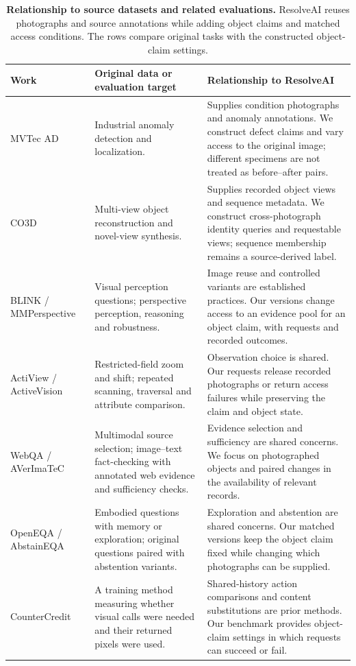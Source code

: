 \begin{table}[t]
\centering\small
\caption{\textbf{Relationship to source datasets and related evaluations.}
ResolveAI reuses photographs and source annotations while adding object claims and matched access conditions.
The rows compare original tasks with the constructed object-claim settings.}
\label{tab:related-comparison}
\renewcommand{\arraystretch}{1.15}
\begin{tabularx}{\textwidth}{@{}>{\raggedright\arraybackslash}p{}>{\raggedright\arraybackslash}p{}Y@{}}
\toprule
Work & Original data or evaluation target & Relationship to ResolveAI\\
\midrule
MVTec AD~\cite{mvtec} &
Industrial anomaly detection and localization. &
Supplies condition photographs and anomaly annotations. We construct defect claims and vary access to the original image; different specimens are not treated as before--after pairs.\\
CO3D~\cite{co3d} &
Multi-view object reconstruction and novel-view synthesis. &
Supplies recorded object views and sequence metadata. We construct cross-photograph identity queries and requestable views; sequence membership remains a source-derived label.\\
BLINK / \mbox{MMPerspective}~\cite{blink,mmperspective} &
Visual perception questions; perspective perception, reasoning and robustness. &
Image reuse and controlled variants are established practices. Our versions change access to an evidence pool for an object claim, with requests and recorded outcomes.\\
ActiView / \mbox{ActiveVision}~\cite{actiview,activevision} &
Restricted-field zoom and shift; repeated scanning, traversal and attribute comparison. &
Observation choice is shared. Our requests release recorded photographs or return access failures while preserving the claim and object state.\\
WebQA / \mbox{AVerImaTeC}~\cite{webqa,averimatec} &
Multimodal source selection; image--text fact-checking with annotated web evidence and sufficiency checks. &
Evidence selection and sufficiency are shared concerns. We focus on photographed objects and paired changes in the availability of relevant records.\\
OpenEQA / \mbox{AbstainEQA}~\cite{openeqa,abstaineqa} &
Embodied questions with memory or exploration; original questions paired with abstention variants. &
Exploration and abstention are shared concerns. Our matched versions keep the object claim fixed while changing which photographs can be supplied.\\
CounterCredit~\cite{countercredit} &
A training method measuring whether visual calls were needed and their returned pixels were used. &
Shared-history action comparisons and content substitutions are prior methods. Our benchmark provides object-claim settings in which requests can succeed or fail.\\
\bottomrule
\end{tabularx}
\end{table}
